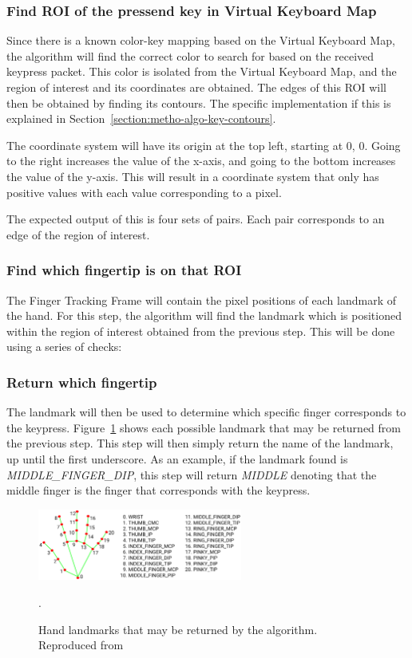 \documentclass{report}
\begin{document}
\subsubsection{Find ROI of the pressend key in Virtual Keyboard Map}
Since there is a known color-key mapping based on the Virtual Keyboard Map, the
algorithm will find the correct color to search for based on the received
keypress packet. This color is isolated from the Virtual Keyboard Map, and the
region of interest and its coordinates are obtained. The edges of this ROI will
then be obtained by finding its contours. The specific implementation if this is
explained in Section~\ref{section:metho-algo-key-contours}.

The coordinate system will have its origin at the top left, starting at 0, 0.
Going to the right increases the value of the x-axis, and going to the bottom
increases the value of the y-axis. This will result in a coordinate system that
only has positive values with each value corresponding to a pixel.

The expected output of this is four sets of pairs. Each pair corresponds to an
edge of the region of interest.

\subsubsection{Find which fingertip is on that ROI}
The Finger Tracking Frame will contain the pixel positions of each landmark of
the hand. For this step, the algorithm will find the landmark which is
positioned within the region of interest obtained from the previous step. This
will be done using a series of checks:

\subsubsection{Return which fingertip}
The landmark will then be used to determine which specific finger corresponds to
the keypress. Figure~\ref{fig:metho-algo-integration-landmarks} shows each
possible landmark that may be returned from the previous step. This step will
then simply return the name of the landmark, up until the first underscore. As
an example, if the landmark found is \emph{MIDDLE\_FINGER\_DIP}, this step will
return \emph{MIDDLE} denoting that the middle finger is the finger that
corresponds with the keypress.

\begin{figure}[H]
	\centering
	\includegraphics[width=0.6\textwidth]{hand-landmarks.png}
	\caption{Hand landmarks that may be returned by the algorithm. Reproduced from }.
	\label{fig:metho-algo-integration-landmarks}
	\centering
\end{figure}
\end{document}
